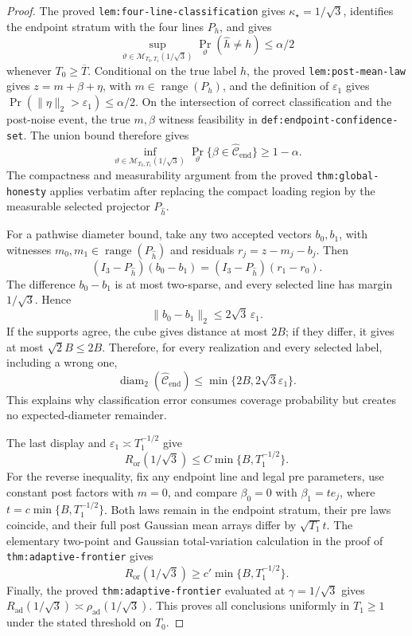 \documentclass{article}
\begin{document}
\begin{proof}
The proved \texttt{lem:four-line-classification} gives \(\kappa_\star=1/\sqrt3\), identifies the endpoint stratum with the four lines \(P_h\), and gives
\[
 \sup_{\vartheta\in\mathcal M_{T_0,T_1}(1/\sqrt3)}
 \Pr_\vartheta(\widehat h\ne h)\le\alpha/2
\]
whenever \(T_0\ge\overline T\).  Conditional on the true label \(h\), the proved \texttt{lem:post-mean-law} gives \(z=m+\beta+\eta\), with \(m\in\operatorname{range}(P_h)\), and the definition of \(\varepsilon_1\) gives \(\Pr(\lVert\eta\rVert_2>\varepsilon_1)\le\alpha/2\).  On the intersection of correct classification and the post-noise event, the true \(m,\beta\) witness feasibility in \texttt{def:endpoint-confidence-set}.  The union bound therefore gives
\[
 \inf_{\vartheta\in\mathcal M_{T_0,T_1}(1/\sqrt3)}
 \Pr_\vartheta\{\beta\in\widehat{\mathcal C}_{\mathrm{end}}\}
 \ge1-\alpha.
\]
The compactness and measurability argument from the proved \texttt{thm:global-honesty} applies verbatim after replacing the compact loading region by the measurable selected projector \(P_{\widehat h}\).

For a pathwise diameter bound, take any two accepted vectors \(b_0,b_1\), with witnesses \(m_0,m_1\in\operatorname{range}(P_{\widehat h})\) and residuals \(r_j=z-m_j-b_j\).  Then
\[
 (I_3-P_{\widehat h})(b_0-b_1)
 =(I_3-P_{\widehat h})(r_1-r_0).
\]
The difference \(b_0-b_1\) is at most two-sparse, and every selected line has margin \(1/\sqrt3\).  Hence
\[
 \lVert b_0-b_1\rVert_2\le2\sqrt3\,\varepsilon_1.
\]
If the supports agree, the cube gives distance at most \(2B\); if they differ, it gives at most \(\sqrt2B\le2B\).  Therefore, for every realization and every selected label, including a wrong one,
\[
 \operatorname{diam}_2(\widehat{\mathcal C}_{\mathrm{end}})
 \le\min\{2B,2\sqrt3\varepsilon_1\}.
\]
This explains why classification error consumes coverage probability but creates no expected-diameter remainder.

The last display and \(\varepsilon_1\asymp T_1^{-1/2}\) give
\[
 R_{\mathrm{or}}(1/\sqrt3)\le C\min\{B,T_1^{-1/2}\}.
\]
For the reverse inequality, fix any endpoint line and legal pre parameters, use constant post factors with \(m=0\), and compare \(\beta_0=0\) with \(\beta_1=t e_j\), where \(t=c\min\{B,T_1^{-1/2}\}\).  Both laws remain in the endpoint stratum, their pre laws coincide, and their full post Gaussian mean arrays differ by \(\sqrt{T_1}t\).  The elementary two-point and Gaussian total-variation calculation in the proof of \texttt{thm:adaptive-frontier} gives
\[
 R_{\mathrm{or}}(1/\sqrt3)\ge c'\min\{B,T_1^{-1/2}\}.
\]
Finally, the proved \texttt{thm:adaptive-frontier} evaluated at \(\gamma=1/\sqrt3\) gives \(R_{\mathrm{ad}}(1/\sqrt3)\asymp\rho_{\mathrm{ad}}(1/\sqrt3)\).  This proves all conclusions uniformly in \(T_1\ge1\) under the stated threshold on \(T_0\).
\end{proof}
\end{document}
